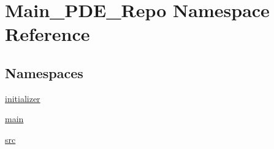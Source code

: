 \hypertarget{namespaceMain__PDE__Repo}{}\section{Main\+\_\+\+P\+D\+E\+\_\+\+Repo Namespace Reference}
\label{namespaceMain__PDE__Repo}
\subsection*{Namespaces}
\begin{DoxyCompactItemize}
\item 
 \hyperlink{namespaceMain__PDE__Repo_1_1initializer}{initializer}
\item 
 \hyperlink{namespaceMain__PDE__Repo_1_1main}{main}
\item 
 \hyperlink{namespaceMain__PDE__Repo_1_1src}{src}
\end{DoxyCompactItemize}
